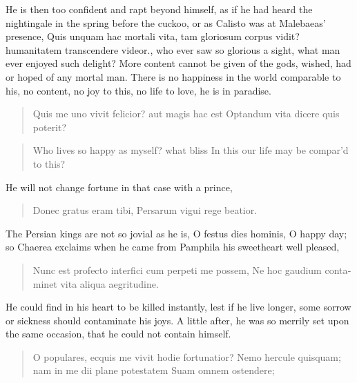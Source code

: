 He is then too confident and rapt beyond himself, as if he had heard
the nightingale in the spring before the cuckoo, or as Calisto
was at Malebaeas' presence, Quis unquam hac mortali vita, tam gloriosum
corpus vidit? humanitatem transcendere videor., \etc{} who ever saw so
glorious a sight, what man ever enjoyed such delight? More content
cannot be given of the gods, wished, had or hoped of any mortal man.
There is no happiness in the world comparable to his, no content, no
joy to this, no life to love, he is in paradise.

\begin{latin}
\begin{verse}
Quis me uno vivit felicior? aut magis hac est
Optandum vita dicere quis poterit?
\end{verse}
\end{latin}
\translationrule%
\begin{verse}%
Who lives so happy as myself? what bliss
In this our life may be compar'd to this?
\end{verse}%

He will not change fortune in that case with a prince,

\begin{latin}
\begin{verse}
Donec gratus eram tibi,
Persarum vigui rege beatior.
\end{verse}
\end{latin}

The Persian kings are not so jovial as he is, O festus dies
hominis, O happy day; so Chaerea exclaims when he came from Pamphila
his sweetheart well pleased,

\begin{latin}
\begin{verse}
Nunc est profecto interfici cum perpeti me possem,
Ne hoc gaudium contaminet vita aliqua aegritudine.
\end{verse}
\end{latin}

He could find in his heart to be killed instantly, lest if he live
longer, some sorrow or sickness should contaminate his joys. A little
after, he was so merrily set upon the same occasion, that he could not
contain himself.

\begin{latin}
\begin{verse}
O populares, ecquis me vivit hodie fortunatior?
Nemo hercule quisquam; nam in me dii plane potestatem
Suam omnem ostendere;
\end{verse}
\end{latin}

